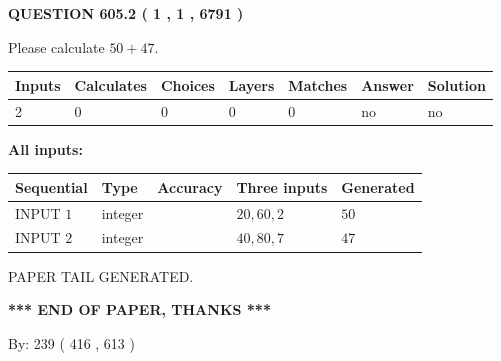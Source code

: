 \documentclass[12pt]{article}
\begin{document}
   
  
\vspace{0.2in}
  
{\textbf{\Large{QUESTION
605.2 
 ( 1 , 1 , 6791 )
}}}
  
  
 
Please calculate $ %
50 +  %
47 $.
 
 
   
   
   
   
\noindent\begin{tabular}{|l|l|l|l|l|l|l|}
 \hline
Inputs & Calculates & Choices & Layers & Matches & Answer & Solution \\ \hline
 2  & 
 0  & 
 0
  & 
 0  & 
 0  & 
  no & 
  no 
  \\ \hline
 \end{tabular}
   
   
   
   
\noindent{}
   
   
   
   
\noindent\vspace{0.1in}\hspace{-0.08in} {\textbf{\Large{All inputs: }}}
   
   
  
  
\noindent\begin{tabular}{|l|l|l|l|l|}
\hline
 Sequential & Type & Accuracy & Three inputs & Generated \\ 
\hline
 
 
  INPUT $  1 $ & integer &  & $
 20
 , 
 60
 , 
 2
 $ & $ 50 $ 
 \\  \hline  
 
 
  INPUT $  2 $ & integer &  & $
 40
 , 
 80
 , 
 7
 $ & $ 47 $ 
 \\  \hline  
 \end{tabular}
   
   
   
   
   
   
 \vspace{0.2in}
 
   
   
\vspace{2.0in} PAPER TAIL GENERATED.
   
   
   
   
\vspace{1.0in} 
{\textbf{\large{ *** END OF PAPER, THANKS *** }}} 
   
   
\hspace{1.0in} By: 
 239 ( 416 ,  613 )
   
\end{document}
